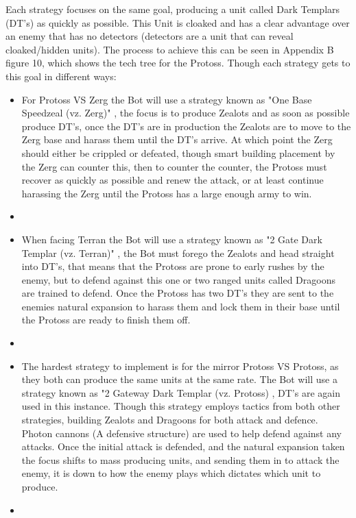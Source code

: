 \documentclass[journal]{IEEEtran}
\begin{document}
	Each strategy focuses on the same goal, producing a unit called Dark Templars (DT's) as quickly as possible. This Unit is cloaked and has a clear advantage over an enemy that has no detectors (detectors are a unit that can reveal cloaked/hidden units). The process to achieve this can be seen in Appendix B figure 10, which shows the tech tree for the Protoss.
	Though each strategy gets to this goal in different ways:
	
	\begin{itemize}
		\item For Protoss VS Zerg the Bot will use a strategy known as "One Base Speedzeal (vz. Zerg)" \cite{PVZ}, the focus is to produce Zealots and as soon as possible produce DT's, once the DT's are in production the Zealots are to move to the Zerg base and harass them until the DT's arrive. At which point the Zerg should either be crippled or defeated, though smart building placement by the Zerg can counter this, then to counter the counter, the Protoss must recover as quickly as possible and renew the attack, or at least continue harassing the Zerg until the Protoss has a large enough army to win.
		\item[]
		\item When facing Terran the Bot will use a strategy known as "2 Gate Dark Templar (vz. Terran)" \cite{PVT}, the Bot must forego the Zealots and head straight into DT's, that means that the Protoss are prone to early rushes by the enemy, but to defend against this one or two ranged units called Dragoons are trained to defend. Once the Protoss has two DT's they are sent to the enemies natural expansion to harass them and lock them in their base until the Protoss are ready to finish them off.
		\item[]
		\item The hardest strategy to implement is for the mirror Protoss VS Protoss, as they both can produce the same units at the same rate. The Bot will use a strategy known as "2 Gateway Dark Templar (vz. Protoss) \cite{PVP}, DT's are again used in this instance. Though this strategy employs tactics from both other strategies, building Zealots and Dragoons for both attack and defence. Photon cannons (A defensive structure) are used to help defend against any attacks. Once the initial attack is defended, and the natural expansion taken the focus shifts to mass producing units, and sending them in to attack the enemy, it is down to how the enemy plays which dictates which unit to produce.
		\item[]
	\end{itemize}
	
\end{document}
